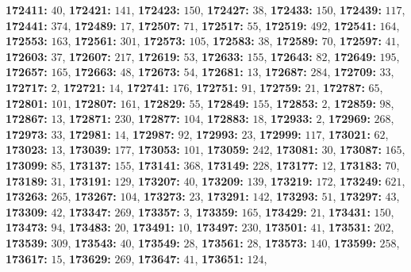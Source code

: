 \textsf{\bfseries 172411:} $40$, \textsf{\bfseries 172421:} $141$, \textsf{\bfseries 172423:} $150$, \textsf{\bfseries 172427:} $38$, \textsf{\bfseries 172433:} $150$, \textsf{\bfseries 172439:} $117$, \textsf{\bfseries 172441:} $374$, \textsf{\bfseries 172489:} $17$, \textsf{\bfseries 172507:} $71$, \textsf{\bfseries 172517:} $55$, \textsf{\bfseries 172519:} $492$, \textsf{\bfseries 172541:} $164$, \textsf{\bfseries 172553:} $163$, \textsf{\bfseries 172561:} $301$, \textsf{\bfseries 172573:} $105$, \textsf{\bfseries 172583:} $38$, \textsf{\bfseries 172589:} $70$, \textsf{\bfseries 172597:} $41$, \textsf{\bfseries 172603:} $37$, \textsf{\bfseries 172607:} $217$, \textsf{\bfseries 172619:} $53$, \textsf{\bfseries 172633:} $155$, \textsf{\bfseries 172643:} $82$, \textsf{\bfseries 172649:} $195$, \textsf{\bfseries 172657:} $165$, \textsf{\bfseries 172663:} $48$, \textsf{\bfseries 172673:} $54$, \textsf{\bfseries 172681:} $13$, \textsf{\bfseries 172687:} $284$, \textsf{\bfseries 172709:} $33$, \textsf{\bfseries 172717:} $2$, \textsf{\bfseries 172721:} $14$, \textsf{\bfseries 172741:} $176$, \textsf{\bfseries 172751:} $91$, \textsf{\bfseries 172759:} $21$, \textsf{\bfseries 172787:} $65$, \textsf{\bfseries 172801:} $101$, \textsf{\bfseries 172807:} $161$, \textsf{\bfseries 172829:} $55$, \textsf{\bfseries 172849:} $155$, \textsf{\bfseries 172853:} $2$, \textsf{\bfseries 172859:} $98$, \textsf{\bfseries 172867:} $13$, \textsf{\bfseries 172871:} $230$, \textsf{\bfseries 172877:} $104$, \textsf{\bfseries 172883:} $18$, \textsf{\bfseries 172933:} $2$, \textsf{\bfseries 172969:} $268$, \textsf{\bfseries 172973:} $33$, \textsf{\bfseries 172981:} $14$, \textsf{\bfseries 172987:} $92$, \textsf{\bfseries 172993:} $23$, \textsf{\bfseries 172999:} $117$, \textsf{\bfseries 173021:} $62$, \textsf{\bfseries 173023:} $13$, \textsf{\bfseries 173039:} $177$, \textsf{\bfseries 173053:} $101$, \textsf{\bfseries 173059:} $242$, \textsf{\bfseries 173081:} $30$, \textsf{\bfseries 173087:} $165$, \textsf{\bfseries 173099:} $85$, \textsf{\bfseries 173137:} $155$, \textsf{\bfseries 173141:} $368$, \textsf{\bfseries 173149:} $228$, \textsf{\bfseries 173177:} $12$, \textsf{\bfseries 173183:} $70$, \textsf{\bfseries 173189:} $31$, \textsf{\bfseries 173191:} $129$, \textsf{\bfseries 173207:} $40$, \textsf{\bfseries 173209:} $139$, \textsf{\bfseries 173219:} $172$, \textsf{\bfseries 173249:} $621$, \textsf{\bfseries 173263:} $265$, \textsf{\bfseries 173267:} $104$, \textsf{\bfseries 173273:} $23$, \textsf{\bfseries 173291:} $142$, \textsf{\bfseries 173293:} $51$, \textsf{\bfseries 173297:} $43$, \textsf{\bfseries 173309:} $42$, \textsf{\bfseries 173347:} $269$, \textsf{\bfseries 173357:} $3$, \textsf{\bfseries 173359:} $165$, \textsf{\bfseries 173429:} $21$, \textsf{\bfseries 173431:} $150$, \textsf{\bfseries 173473:} $94$, \textsf{\bfseries 173483:} $20$, \textsf{\bfseries 173491:} $10$, \textsf{\bfseries 173497:} $230$, \textsf{\bfseries 173501:} $41$, \textsf{\bfseries 173531:} $202$, \textsf{\bfseries 173539:} $309$, \textsf{\bfseries 173543:} $40$, \textsf{\bfseries 173549:} $28$, \textsf{\bfseries 173561:} $28$, \textsf{\bfseries 173573:} $140$, \textsf{\bfseries 173599:} $258$, \textsf{\bfseries 173617:} $15$, \textsf{\bfseries 173629:} $269$, \textsf{\bfseries 173647:} $41$, \textsf{\bfseries 173651:} $124$, 
